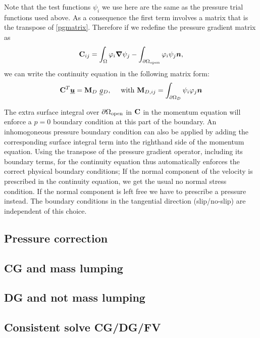 Note that the test functions $\psi_i$ we use here are the 
same as the pressure trial functions used above. As a consequence
the first term involves a matrix that is the
transpose of \eqref{pgmatrix}. Therefore if we redefine the pressure 
gradient matrix as
\begin{equation*}
  {\mbox{\boldmath$\mathrm{C}$}}_{ij}=\int_\Omega \varphi_i{\mbox{\boldmath$\nabla$}}\psi_j 
    -\int_{{\partial\Omega}_{\mathrm{open}}} \varphi_i\psi_j {\mbox{\boldmath$n$}},
\end{equation*}
we can write the continuity equation in the following matrix form:
\begin{equation*}
  {\mbox{\boldmath$\mathrm{C}$}}^T \underline{{\mbox{\boldmath$u$}}}=
    {\mbox{\boldmath$\mathrm{M}$}}_D ~\underline{g}{}_D, 
    \quad\text{ with }
    {\mbox{\boldmath$\mathrm{M}$}}_{D,ij}=\int_{{\partial\Omega}_D} \psi_i\varphi_j{\mbox{\boldmath$n$}}
\end{equation*}

The extra surface integral over ${\partial\Omega}_{\mathrm{open}}$ in 
${\mbox{\boldmath$\mathrm{C}$}}$ in the momentum equation will enforce
a $p=0$ boundary condition at this part of the boundary. An inhomogoneous 
pressure boundary condition can also be applied by adding the corresponding
surface integral term into the righthand side of the momentum equation.
Using the transpose of the pressure gradient operator, including its
boundary terms, for the continuity equation thus automatically 
enforces the correct physical boundary conditions; If the normal 
component of the velocity is prescribed in the continuity equation, 
we get the usual no normal stress condition. If the normal component 
is left free we have to prescribe a pressure instead. The boundary 
conditions in the tangential direction (slip/no-slip) are independent of this choice.


\subsection{Pressure correction}

\subsection{CG and mass lumping}
\label{Sect:ND_cg_mass_lumping}


\subsection{DG and not mass lumping}

\subsection{Consistent solve CG/DG/FV}

